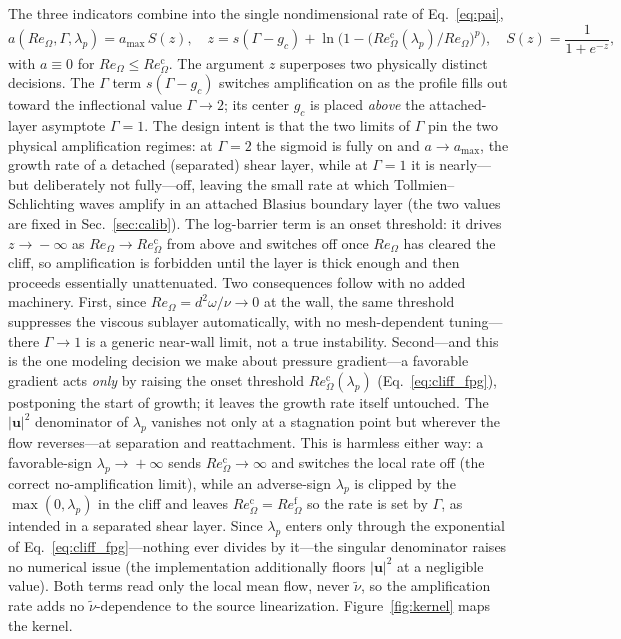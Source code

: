 \documentclass[journal]{new-aiaa}
\begin{document}
The three indicators combine into the single nondimensional rate of
Eq.~\eqref{eq:pai},
\begin{equation}
  a(Re_\Omega,\Gamma,\lambda_p) = a_{\max}\,S(z),
  \quad
  z = s(\Gamma-g_c) + \ln\!\Big(1-\big(Re_\Omega^{\mathrm{c}}(\lambda_p)/Re_\Omega\big)^{p}\Big),
  \quad S(z)=\frac{1}{1+e^{-z}},
  \label{eq:rate}
\end{equation}
with $a\equiv0$ for $Re_\Omega\le Re_\Omega^{\mathrm{c}}$.
The argument $z$ superposes two physically distinct decisions. The
$\Gamma$ term $s(\Gamma-g_c)$ switches amplification on as the profile fills out
toward the inflectional value $\Gamma\!\to\!2$; its center $g_c$ is placed
\emph{above} the attached-layer asymptote $\Gamma\!=\!1$. The design intent
is that the two limits of $\Gamma$ pin the two physical amplification regimes: at
$\Gamma\!=\!2$ the sigmoid is fully on and $a\!\to\!a_{\max}$, the growth rate of a
detached (separated) shear layer, while at $\Gamma\!=\!1$ it is nearly---but
deliberately not fully---off, leaving the small rate at which Tollmien--Schlichting
waves amplify in an attached Blasius boundary layer (the two values are fixed in
Sec.~\ref{sec:calib}). The log-barrier
term is an onset threshold: it drives $z\!\to\!-\infty$ as
$Re_\Omega\!\to\!Re_\Omega^{\mathrm{c}}$ from above and switches off once
$Re_\Omega$ has cleared the cliff, so amplification is forbidden until the layer
is thick enough and then proceeds essentially unattenuated. Two consequences
follow with no added machinery. First, since
$Re_\Omega\!=\!d^2\omega/\nu\!\to\!0$ at the wall, the same threshold suppresses
the viscous sublayer automatically, with no mesh-dependent tuning---there
$\Gamma\!\to\!1$ is a generic near-wall limit, not a true instability. Second---and this is the one modeling decision we make about
pressure gradient---a favorable gradient acts \emph{only} by raising the onset
threshold $Re_\Omega^{\mathrm{c}}(\lambda_p)$ (Eq.~\eqref{eq:cliff_fpg}),
postponing the start of growth; it leaves the growth rate itself untouched. The
$|\mathbf{u}|^2$ denominator of $\lambda_p$ vanishes not only at a stagnation point
but wherever the flow reverses---at separation and reattachment. This is harmless
either way: a favorable-sign $\lambda_p\!\to\!+\infty$ sends
$Re_\Omega^{\mathrm{c}}\!\to\!\infty$ and switches the local rate off (the correct
no-amplification limit), while an adverse-sign $\lambda_p$ is clipped by the
$\max(0,\lambda_p)$ in the cliff and leaves $Re_\Omega^{\mathrm{c}}\!=\!
Re_\Omega^{\mathrm{f}}$ so the rate is set by $\Gamma$, as intended in a separated
shear layer. Since $\lambda_p$ enters only through the exponential of
Eq.~\eqref{eq:cliff_fpg}---nothing ever divides by it---the singular
denominator raises no numerical issue
(the implementation additionally floors $|\mathbf{u}|^2$ at a negligible
value). Both terms read only the local mean flow, never
$\tilde\nu$, so the amplification rate adds no $\tilde\nu$-dependence to the
source linearization. Figure~\ref{fig:kernel} maps the kernel.
\end{document}
